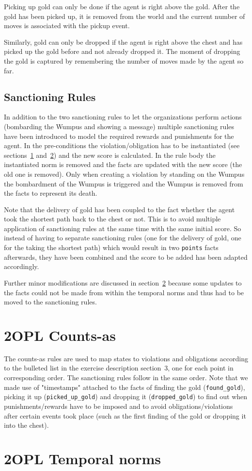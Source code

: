 \documentclass[a4paper,11pt]{article}
\begin{document}
Picking up gold can only be done if the agent is right above the gold. After the gold has been picked up, it is removed from the world and the current number of moves is associated with the pickup event.

Similarly, gold can only be dropped if the agent is right above the chest and has picked up the gold before and not already dropped it. The moment of dropping the gold is captured by remembering the number of moves made by the agent so far.

\subsection{Sanctioning Rules}
\label{sec:sanct}
In addition to the two sanctioning rules to let the organizations perform actions (bombarding the Wumpus and showing a message) multiple sanctioning rules have been introduced to model the required rewards and punishments for the agent. In the pre-conditions the violation/obligation has to be instantiated (see sections~\ref{sec:counts} and~\ref{sec:norms}) and the new score is calculated. In the rule body the instantiated norm is removed and the facts are updated with the new score (the old one is removed). Only when creating a violation by standing on the Wumpus the bombardment of the Wumpus is triggered and the Wumpus is removed from the facts to represent its death.

Note that the delivery of gold has been coupled to the fact whether the agent took the shortest path back to the chest or not. This is to avoid multiple application of sanctioning rules at the same time with the same initial score. So instead of having to separate sanctioning rules (one for the delivery of gold, one for the taking the shortest path) which would result in two \texttt{points} facts afterwards, they have been combined and the score to be added has been adapted accordingly.

Further minor modifications are discussed in section~\ref{sec:norms} because some updates to the facts could not be made from within the temporal norms and thus had to be moved to the sanctioning rules.

\section{2OPL Counts-as}
\label{sec:counts}
The counts-as rules are used to map states to violations and obligations according to the bulleted list in the exercise description section~3, one for each point in corresponding order. The sanctioning rules follow in the same order. Note that we made use of "timestamps" attached to the facts of finding the gold (\texttt{found\_gold}), picking it up (\texttt{picked\_up\_gold}) and dropping it (\texttt{dropped\_gold}) to find out when punishments/rewards have to be imposed and to avoid obligations/violations after certain events took place (such as the first finding of the gold or dropping it into the chest).

\section{2OPL Temporal norms}
\label{sec:norms}
\end{document}
